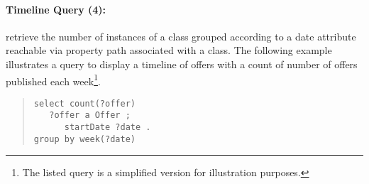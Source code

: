 \paragraph{Timeline Query (4):} retrieve the number of instances of a class grouped according to a date attribute reachable via property path associated with a class.
The following example illustrates a query to display a timeline of offers with a count of number of offers published each week\footnote{The listed query is a simplified version for illustration purposes.}.
\begin{quote}
{\footnotesize
\begin{verbatim}
select count(?offer)
   ?offer a Offer ;
      startDate ?date .
group by week(?date)
\end{verbatim}}
\end{quote}
